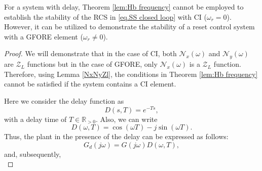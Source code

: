 \begin{corollary}
    \label{CI,GFORE}
    For a system with delay, Theorem \ref{lem:Hb frequency} cannot be employed to establish the stability of the RCS in \eqref{eq.SS closed loop} with CI ($\omega_r=0$). However, it can be utilized to demonstrate the stability of a reset control system with a GFORE element ($\omega_r\neq0$).
\end{corollary}
\begin{proof}
    We will demonstrate that in the case of CI, both $\mathcal{N}_x (\omega)$ and $\mathcal{N}_y (\omega)$ are $\mathcal{Z}_L$ functions but in the case of GFORE, only $\mathcal{N}_x (\omega)$ is a $\mathcal{Z}_L$ function. Therefore, using Lemma \ref{NxNyZl}, the conditions in Theorem \ref{lem:Hb frequency} cannot be satisfied if the system contains a CI element.\\
\begin{comment}
Here we consider the delay function as 
\begin{equation}
\label{Euler}
    D(s,T)=e^{-Ts}=\cos{(\omega T)}-j\sin{(\omega T)},
\end{equation}
with a delay time $T$. By using the Pade approximation (\cite[chapter 9]{golub2013matrix}, \cite{gragg1972pade}) we have
\begin{equation}
    D(s,T)\simeq D(s,T)
\end{equation}
where
\begin{equation}
D(s,T)=\frac{a_0+a_1 Ts+a_2 T^2 s^2+...+a_m T^m s^m}{b_0+b_1 Ts+b_2 T^2 s^2+...+b_n T^n s^n},
\end{equation}
with stable poles. According to \eqref{Euler} we have
\begin{equation}
    D(\omega,T)\simeq\cos{(\omega T)}-j\sin{(\omega T)}.
\end{equation}
\end{comment}
Here we consider the delay function as 
\begin{equation}
\label{Euler}
    D(s,T)=e^{-Ts},
\end{equation}
with a delay time of $T\in  \mathbb{R}_{>0}$. Also, we can write 
\begin{equation}
    D(\omega,T)=\cos{(\omega T)}-j\sin{(\omega T)}.
\end{equation}
Thus, the plant in the presence of the delay can be expressed as follows:
\begin{equation}
\label{Gd}
G_d(j\omega)=G(j\omega)D(\omega,T),
\end{equation}
and, subsequently,
\begin{equation}

\end{equation}
\end{proof}
